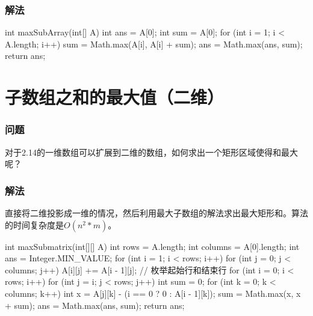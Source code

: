\subsubsection{解法}

\begin{Codex}[label={[$O(n)+O(1)$]Chap02_14_MaxSubarray.java}]
	int maxSubArray(int[] A) {
		int ans = A[0];
		int sum = A[0];
		for (int i = 1; i < A.length; i++) {
			sum = Math.max(A[i], A[i] + sum);
			ans = Math.max(ans, sum);
		}
		return ans;
	}
\end{Codex}

\section{子数组之和的最大值（二维）} %
\label{sec:max-sum-two-dimon}

\subsubsection{问题}
对于2.14的一维数组可以扩展到二维的数组，如何求出一个矩形区域使得和最大呢？

\subsubsection{解法}
直接将二维投影成一维的情况，然后利用最大子数组的解法求出最大矩形和。算法的时间复杂度是$O(n^2*m)$。

\begin{Codex}[label={[$O(n^2*m)+O(1)$]Chap02_15_MaxSubmatrix.java}]
	int maxSubmatrix(int[][] A) {
		int rows = A.length;
		int columns = A[0].length;
		int ans = Integer.MIN_VALUE;
		for (int i = 1; i < rows; i++) {
			for (int j = 0; j < columns; j++) {
				A[i][j] += A[i - 1][j];
			}
		}
		// 枚举起始行和结束行
		for (int i = 0; i < rows; i++) {
			for (int j = i; j < rows; j++) {
				int sum = 0;
				for (int k = 0; k < columns; k++) {
					int x = A[j][k] - (i == 0 ? 0 : A[i - 1][k]);
					sum = Math.max(x, x + sum);
					ans = Math.max(ans, sum);
				}
			}
		}
		return ans;
	}
\end{Codex}


